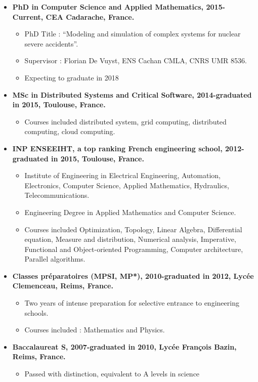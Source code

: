 \documentclass{article}
\begin{document}
\begin{itemize}
  	\item \textbf{PhD in Computer Science and Applied Mathematics, 2015-Current, CEA Cadarache, France.}
		\begin{itemize}
			\item PhD Title : ``Modeling and simulation of complex systems for nuclear severe accidents''.
			\item Supervisor : Florian De Vuyst, ENS Cachan CMLA, CNRS UMR 8536.
			\item Expecting to graduate in 2018
		\end{itemize}
	\item \textbf{MSc in Distributed Systems and Critical Software, 2014-graduated in 2015, Toulouse, France.}
		\begin{itemize}
			\item Courses included distributed system, grid computing, distributed computing, cloud computing.
		\end{itemize}
    \item \textbf{INP ENSEEIHT, a top ranking French engineering school, 2012-graduated in 2015, Toulouse, France.}
		\begin{itemize}
			\item Institute of Engineering in Electrical Engineering, Automation, Electronics, Computer Science, Applied Mathematics, Hydraulics, Telecommunications.
			\item Engineering Degree in Applied Mathematics and Computer Science.
			\item Courses included Optimization, Topology, Linear Algebra, Differential equation, Measure and distribution, Numerical analysis, Imperative, Functional and Object-oriented Programming, Computer architecture, Parallel algorithms.
		\end{itemize}
	\item \textbf{Classes préparatoires (MPSI, MP*), 2010-graduated in 2012, Lycée Clemenceau, Reims, France.}
		\begin{itemize}
			\item Two years of intense preparation for selective entrance to engineering schools.
			\item Courses included : Mathematics and Physics.
		\end{itemize}
	\item \textbf{Baccalaureat S, 2007-graduated in 2010, Lycée François Bazin, Reims, France.}
		\begin{itemize}
			\item Passed with distinction, equivalent to A levels in science
		\end{itemize}
\end{itemize}
\end{document}
